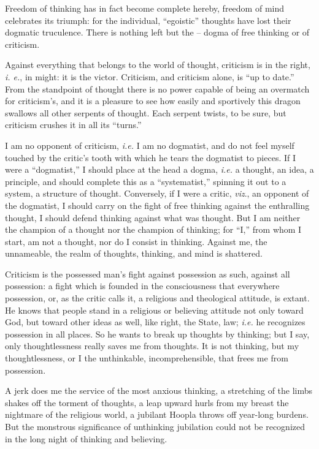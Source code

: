 \documentclass[12pt,a4paper]{book}
\begin{document}
Freedom of thinking has in fact become complete hereby, freedom of mind 
celebrates its triumph: for the individual, ``egoistic'' thoughts have lost 
their dogmatic truculence. There is nothing left but the -- dogma of free 
thinking or of criticism.

Against everything that belongs to the world of thought, criticism is in the 
right, \textit{i. e.}, in might: it is the victor. Criticism, and criticism 
alone, is ``up to date.'' From the standpoint of thought there is no power 
capable of being an overmatch for criticism's, and it is a pleasure to see how 
easily and sportively this dragon swallows all other serpents of thought. Each 
serpent twists, to be sure, but criticism crushes it in all its ``turns.''

I am no opponent of criticism, \textit{i.e.} I am no dogmatist, and do not 
feel myself touched by the critic's tooth with which he tears the dogmatist to 
pieces. If I were a ``dogmatist,'' I should place at the head a dogma, 
\textit{i.e.} a thought, an idea, a principle, and should complete this as a 
``systematist,'' spinning it out to a system, a structure of thought. 
Conversely, if I were a critic, \textit{viz}., an opponent of the dogmatist, I 
should carry on the fight of free thinking against the enthralling thought, I 
should defend thinking against what was thought. But I am neither the champion 
of a thought nor the champion of thinking; for ``I,'' from whom I start, am 
not a thought, nor do I consist in thinking. Against me, the unnameable, the 
realm of thoughts, thinking, and mind is shattered.

Criticism is the possessed man's fight against possession as such, against all 
possession: a fight which is founded in the consciousness that everywhere 
possession, or, as the critic calls it, a religious and theological attitude, 
is extant. He knows that people stand in a religious or believing attitude not 
only toward God, but toward other ideas as well, like right, the State, law; 
\textit{i.e.} he recognizes possession in all places. So he wants to break up 
thoughts by thinking; but I say, only thoughtlessness really saves me from 
thoughts. It is not thinking, but my thoughtlessness, or I the unthinkable, 
incomprehensible, that frees me from possession.

A jerk does me the service of the most anxious thinking, a stretching of the 
limbs shakes off the torment of thoughts, a leap upward hurls from my breast 
the nightmare of the religious world, a jubilant Hoopla throws off year-long 
burdens. But the monstrous significance of unthinking jubilation could not be 
recognized in the long night of thinking and believing.
\end{document}
